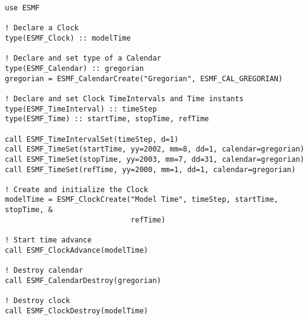
\begin{verbatim}
use ESMF

! Declare a Clock
type(ESMF_Clock) :: modelTime

! Declare and set type of a Calendar
type(ESMF_Calendar) :: gregorian
gregorian = ESMF_CalendarCreate("Gregorian", ESMF_CAL_GREGORIAN)

! Declare and set Clock TimeIntervals and Time instants
type(ESMF_TimeInterval) :: timeStep
type(ESMF_Time) :: startTime, stopTime, refTime

call ESMF_TimeIntervalSet(timeStep, d=1)
call ESMF_TimeSet(startTime, yy=2002, mm=8, dd=1, calendar=gregorian)
call ESMF_TimeSet(stopTime, yy=2003, mm=7, dd=31, calendar=gregorian)
call ESMF_TimeSet(refTime, yy=2000, mm=1, dd=1, calendar=gregorian)

! Create and initialize the Clock
modelTime = ESMF_ClockCreate("Model Time", timeStep, startTime, stopTime, &
                             refTime)

! Start time advance
call ESMF_ClockAdvance(modelTime)

! Destroy calendar
call ESMF_CalendarDestroy(gregorian)

! Destroy clock
call ESMF_ClockDestroy(modelTime)
\end{verbatim}
